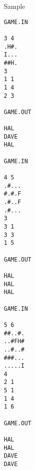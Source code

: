 Sample
\begin{verbatim}
GAME.IN

3 4
.H#.
I...
##H.
3
1 1
1 4
2 3

GAME.OUT

HAL
DAVE
HAL

GAME.IN

4 5
.#...
#.#.F
.#..F
.#...
3
3 1
3 3
1 5

GAME.OUT

HAL
HAL
HAL

GAME.IN

5 6
##..#.
..#FH#
..#..#
###...
.....I
4
2 1
5 1
1 4
1 6

GAME.OUT

HAL
HAL
DAVE
DAVE

\end{verbatim}